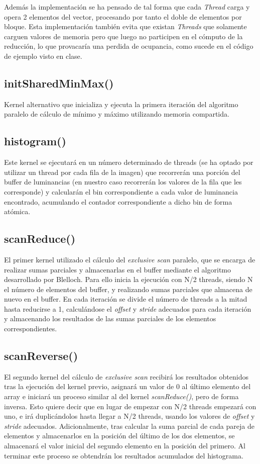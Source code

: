 \documentclass[10pt,oneside,a4paper]{article}
\begin{document}
Además la implementación se ha pensado de tal forma que cada \textit{Thread} carga y opera 2 elementos del vector, procesando por tanto el doble de elementos por bloque. Esta implementación también evita que existan \textit{Threads} que solamente carguen valores de memoria pero que luego no participen en el cómputo de la reducción, lo que provacaría una perdida de ocupancia, como sucede en el código de ejemplo visto en clase.
\subsection{initSharedMinMax()}
Kernel alternativo que inicializa y ejecuta la primera iteración del algoritmo paralelo de cálculo de mínimo y máximo utilizando memoria compartida.

\subsection{histogram()}
Este kernel se ejecutará en un número determinado de threads (se ha optado por utilizar un thread por cada fila de la imagen) que recorrerán una porción del buffer de luminancias (en nuestro caso recorrerán los valores de la fila que les corresponde) y calcularán el bin correspondiente a cada valor de luminancia encontrado, acumulando el contador correspondiente a dicho bin de forma atómica.

\subsection{scanReduce()}
El primer kernel utilizado el cálculo del \textit{exclusive scan} paralelo, que se encarga de realizar sumas parciales y almacenarlas en el buffer mediante el algoritmo desarrollado por Blelloch. Para ello inicia la ejecución con N/2 threads, siendo N el número de elementos del buffer, y realizando sumas parciales que almacena de nuevo en el buffer. En cada iteración se divide el número de threads a la mitad hasta reducirse a 1, calculándose el \emph{offset} y \emph{stride} adecuados para cada iteración y almacenando los resultados de las sumas parciales de los elementos correspondientes. 

\subsection{scanReverse()}
El segundo kernel del cálculo de \textit{exclusive scan} recibirá los resultados obtenidos tras la ejecución del kernel previo, asignará un valor de 0 al último elemento del array e iniciará un proceso similar al del kernel \textit{scanReduce()}, pero de forma inversa. Esto quiere decir que en lugar de empezar con N/2 threads empezará con uno, e irá duplicándolos hasta llegar a N/2 threads, usando los valores de \emph{offset} y \emph{stride} adecuados. Adicionalmente, tras calcular la suma parcial de cada pareja de elementos y almacenarlos en la posición del último de los dos elementos, se almacenará el valor inicial del segundo elemento en la posición del primero. Al terminar este proceso se obtendrán los resultados acumulados del histograma.
\end{document}
